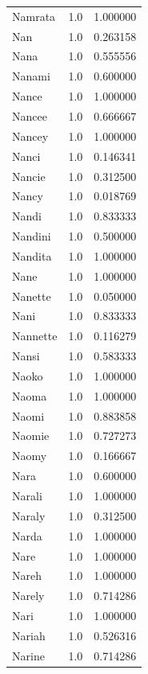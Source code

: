 \documentclass[
  letterpaper,
  DIV=11,
  numbers=noendperiod]{scrreprt}
\begin{document}
\begin{tabular}{lrr}
Namrata         &   1.0 &   1.000000 \\
Nan             &   1.0 &   0.263158 \\
Nana            &   1.0 &   0.555556 \\
Nanami          &   1.0 &   0.600000 \\
Nance           &   1.0 &   1.000000 \\
Nancee          &   1.0 &   0.666667 \\
Nancey          &   1.0 &   1.000000 \\
Nanci           &   1.0 &   0.146341 \\
Nancie          &   1.0 &   0.312500 \\
Nancy           &   1.0 &   0.018769 \\
Nandi           &   1.0 &   0.833333 \\
Nandini         &   1.0 &   0.500000 \\
Nandita         &   1.0 &   1.000000 \\
Nane            &   1.0 &   1.000000 \\
Nanette         &   1.0 &   0.050000 \\
Nani            &   1.0 &   0.833333 \\
Nannette        &   1.0 &   0.116279 \\
Nansi           &   1.0 &   0.583333 \\
Naoko           &   1.0 &   1.000000 \\
Naoma           &   1.0 &   1.000000 \\
Naomi           &   1.0 &   0.883858 \\
Naomie          &   1.0 &   0.727273 \\
Naomy           &   1.0 &   0.166667 \\
Nara            &   1.0 &   0.600000 \\
Narali          &   1.0 &   1.000000 \\
Naraly          &   1.0 &   0.312500 \\
Narda           &   1.0 &   1.000000 \\
Nare            &   1.0 &   1.000000 \\
Nareh           &   1.0 &   1.000000 \\
Narely          &   1.0 &   0.714286 \\
Nari            &   1.0 &   1.000000 \\
Nariah          &   1.0 &   0.526316 \\
Narine          &   1.0 &   0.714286 \\

\end{tabular}
\end{document}
